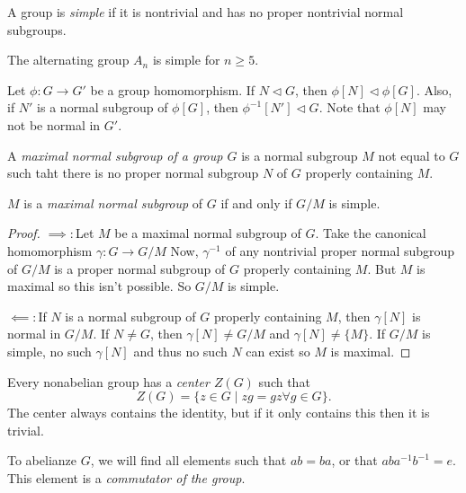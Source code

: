 \begin{definition}
    A group is \emph{simple} if it is nontrivial and has no proper nontrivial normal subgroups.
\end{definition}
\begin{remark}
    The alternating group $A_n$ is simple for $n\geq 5.$
\end{remark}
\begin{theorem}
    Let $\phi\colon G\to G'$ be a group homomorphism. If $N \vartriangleleft G$, then $\phi[N] \vartriangleleft \phi[G].$ Also, if $N'$ is a normal subgroup of $\phi[G]$, then $\phi^{-1}[N'] \vartriangleleft G$. Note that $\phi[N]$ may not be normal in $G'$.
\end{theorem}
\begin{definition}
    A \emph{maximal normal subgroup of a group $G$} is a normal subgroup $M$ not equal to $G$ such taht there is no proper normal subgroup $N$ of $G$ properly containing $M$.
\end{definition}
\begin{theorem}
    $M$ is a \emph{maximal normal subgroup} of $G$ if and only if $G/M$ is simple.
\end{theorem}
\begin{proof}
    $\implies\colon$Let $M$ be a maximal normal subgroup of $G$. Take the canonical homomorphism $\gamma\colon G\to G/M$ Now, $\gamma^{-1}$ of any nontrivial proper normal subgroup of $G/M$ is a proper normal subgroup of $G$ properly containing $M$. But $M$ is maximal so this isn't possible. So $G/M$ is simple.

    $\impliedby\colon$If $N$ is a normal subgroup of $G$ properly containing $M$, then $\gamma[N]$ is normal in $G/M$. If $N\neq G$, then $\gamma[N]\neq G/M$ and $\gamma[N]\neq\{M\}.$ If $G/M$ is simple, no such $\gamma[N]$ and thus no such $N$ can exist so $M$ is maximal.
\end{proof}
\begin{definition}[Center of $G$]
    Every nonabelian group has a \emph{center $Z(G)$} such that $$Z(G) = \{z \in G \mid zg =g z \forall g \in G\}.$$ The center always contains the identity, but if it only contains this then it is trivial.
\end{definition}
\begin{definition}[Commutator]
    To abelianze $G$, we will find all elements such that $ab=ba$, or that $aba^{-1}b^{-1}=e$. This element is a \emph{commutator of the group}.
\end{definition}
